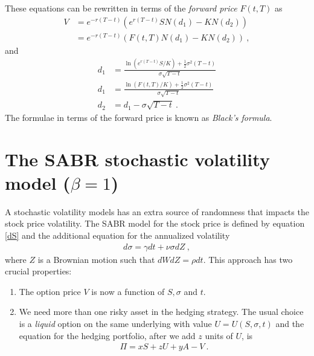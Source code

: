 \documentclass[10pt]{article}
\numberwithin{equation}{section}
\begin{document}
These equations can be rewritten in terms of the \emph{forward price} $F(t,T)$ as
\begin{equation}
	\begin{split}
	V &= e^{-r(T-t)}(e^{r(T-t)}S N(d_1) - K N(d_2))\\
	   &= e^{-r(T-t)}(F(t,T) N(d_1) - K N(d_2))\:,
	\end{split}
\end{equation}
and
\begin{equation}
	\begin{split}
	d_1 &= \frac{\ln(e^{r(T-t)}S/K)+\frac{1}{2} \sigma^2(T-t)}{\sigma \sqrt{T-t}}\\
	d_1 &= \frac{\ln(F(t,T)/K)+\frac{1}{2} \sigma^2(T-t)}{\sigma \sqrt{T-t}}\\
	d_2 &= d_1 - \sigma \sqrt{T-t}\:.
	\end{split}
\end{equation}
The formulae in terms of the forward price is known as \emph{Black's formula}.

\section{The SABR stochastic volatility model ($\beta=1$)}
A stochastic volatility models has an extra source of randomness that impacts the stock price volatility. The SABR model for the stock price is defined by equation \eqref{dS} and the additional equation for the annualized volatility
\begin{equation}\label{dsigma}
	\begin{split}
	d\sigma = \gamma dt + \nu \sigma dZ \:,
	\end{split}
\end{equation}
where $Z$ is a Brownian motion such that $dWdZ=\rho dt$. This approach has two crucial properties:
\begin{enumerate}
\item The option price $V$ is now a function of $S,\sigma$ and $t$.
\item We need more than one risky asset in the hedging strategy. The usual choice is a \emph{liquid} option on the same underlying with value $U=U(S,\sigma,t)$ and the equation for the hedging portfolio, after we add $z$ units of $U$, is
\begin{equation*}
	\begin{split}
	\Pi = x S + z U + y A - V\:.
	\end{split}
\end{equation*}
\end{enumerate}
\end{document}

